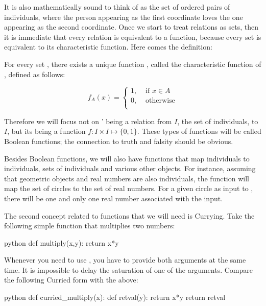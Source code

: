\documentclass[11pt,a4paper,draft]{article}
\begin{document}
It is also mathematically sound to think of  as the set of ordered pairs of individuals, where the person appearing as the first coordinate loves the one appearing as the second coordinate. Once we start to treat relations as sets, then it is immediate that every relation is equivalent to a function, because every set is equivalent to its characteristic function. Here comes the definition:

\begin{udefinition}
For every set , there exists a unique function , called the characteristic function of , defined as follows:

$$
f_A(x) =
\begin{cases}
1, & \text{ if } x \in A \\
0, & \text{ otherwise} \\
\end{cases}
$$
\end{udefinition}


Therefore we will focus not on ' being a relation from $I$, the set of individuals, to  $I$, but its being a function $f:I\times I\mapsto \{0,1\}$. These types of functions will be called Boolean functions; the connection to truth and falsity should be obvious.

Besides Boolean functions, we will also have functions that map individuals to individuals, sets of individuals and various other objects. For instance, assuming that geometric objects and real numbers are also individuals, the function  will map the set of circles to the set of real numbers. For a given circle as input to , there will be one and only one real number associated with the input.


The second concept related to functions that we will need is Currying. Take the following simple function that multiplies two numbers:

\begin{pygments}[frame=single]{python}
def multiply(x,y):
	return x*y
\end{pygments}

Whenever you need to use , you have to provide both arguments at the same time. It is impossible to delay the saturation of one of the arguments. Compare the following Curried form with the above: 

\begin{pygments}[frame=single]{python}
def curried_multiply(x):
	def retval(y):
		return x*y
	return retval 
\end{pygments}
\end{document}
